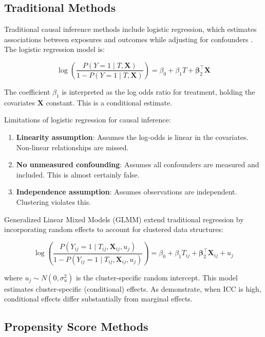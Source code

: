 \subsection{Traditional Methods}

Traditional causal inference methods include logistic regression, which estimates associations between exposures and outcomes while adjusting for confounders \citep{austin2011introduction}. The logistic regression model is:

\[
\log\left(\frac{P(Y=1 \mid T, \mathbf{X})}{1-P(Y=1 \mid T, \mathbf{X})}\right) = \beta_0 + \beta_1 T + \boldsymbol{\beta}_2^\top \mathbf{X}
\]

The coefficient $\beta_1$ is interpreted as the log odds ratio for treatment, holding the covariates $\mathbf{X}$ constant. This is a conditional estimate.

Limitations of logistic regression for causal inference:

\begin{enumerate}
	\item \textbf{Linearity assumption}: Assumes the log-odds is linear in the covariates. Non-linear relationships are missed.
	
	\item \textbf{No unmeasured confounding}: Assumes all confounders are measured and included. This is almost certainly false.
	
	\item \textbf{Independence assumption}: Assumes observations are independent. Clustering violates this.
\end{enumerate}

Generalized Linear Mixed Models (GLMM) extend traditional regression by incorporating random effects to account for clustered data structures:

\[
\log\left(\frac{P(Y_{ij}=1 \mid T_{ij}, \mathbf{X}_{ij}, u_j)}{1-P(Y_{ij}=1 \mid T_{ij}, \mathbf{X}_{ij}, u_j)}\right) = \beta_0 + \beta_1 T_{ij} + \boldsymbol{\beta}_2^\top \mathbf{X}_{ij} + u_j
\]

where $u_j \sim N(0, \sigma_u^2)$ is the cluster-specific random intercept. This model estimates cluster-specific (conditional) effects. As \citet{neuhaus1991comparison} demonstrate, when ICC is high, conditional effects differ substantially from marginal effects.

\subsection{Propensity Score Methods}

